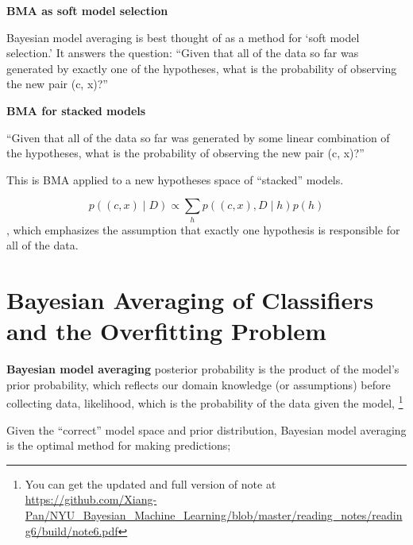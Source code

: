 \documentclass{article}
\begin{document}
\textbf{BMA as soft model selection}

Bayesian model averaging is best thought of as a method for ‘soft model selection.’ It answers the question: “Given that all of the data so far was generated by exactly one of the hypotheses, what is the probability of observing the new pair (c, x)?”

\textbf{BMA for stacked models}

“Given that all of the data so far was generated by some linear combination of the hypotheses, what is the probability of observing the new pair (c, x)?”

This is BMA applied to a new hypotheses space of “stacked” models. 

\begin{equation}
    p((c, x) \mid D) \propto \sum_{h} p((c, x), D \mid h) p(h)
\end{equation},
which emphasizes the assumption that exactly one hypothesis is responsible for all of the data.

\section{Bayesian Averaging of Classiﬁers and the Overﬁtting Problem\cite{domingos__BayesianAveragingClassifiers}}
\textbf{Bayesian model averaging}
posterior probability is the product of the model’s prior probability, which reﬂects our domain knowledge (or assumptions) before collecting data, likelihood, which is the probability of the data given the model, \footnote{You can get the updated and full version of note at \url{https://github.com/Xiang-Pan/NYU_Bayesian_Machine_Learning/blob/master/reading_notes/reading6/build/note6.pdf}}

Given the “correct” model space and prior distribution, Bayesian model averaging is the optimal method for making predictions; 


\end{document}
